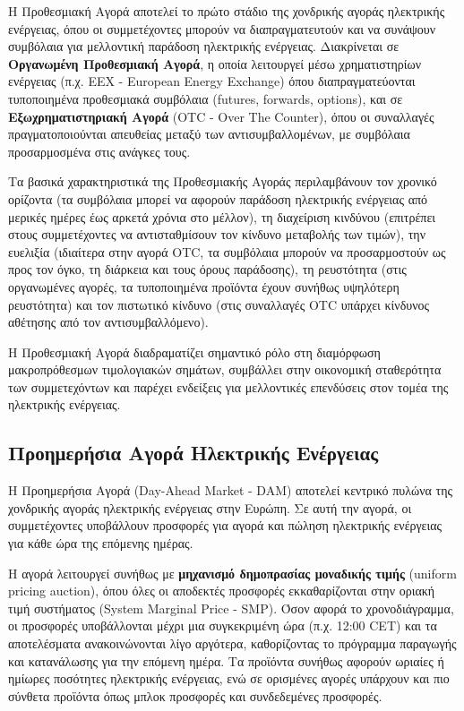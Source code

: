 Η Προθεσμιακή Αγορά αποτελεί το πρώτο στάδιο της χονδρικής αγοράς ηλεκτρικής ενέργειας, όπου οι συμμετέχοντες μπορούν να διαπραγματευτούν και να συνάψουν συμβόλαια για μελλοντική παράδοση ηλεκτρικής ενέργειας. Διακρίνεται σε \textbf{Οργανωμένη Προθεσμιακή Αγορά}, η οποία λειτουργεί μέσω χρηματιστηρίων ενέργειας (π.χ. EEX - European Energy Exchange) όπου διαπραγματεύονται τυποποιημένα προθεσμιακά συμβόλαια (futures, forwards, options), και σε \textbf{Εξωχρηματιστηριακή Αγορά} (OTC - Over The Counter), όπου οι συναλλαγές πραγματοποιούνται απευθείας μεταξύ των αντισυμβαλλομένων, με συμβόλαια προσαρμοσμένα στις ανάγκες τους.

Τα βασικά χαρακτηριστικά της Προθεσμιακής Αγοράς περιλαμβάνουν τον χρονικό ορίζοντα (τα συμβόλαια μπορεί να αφορούν παράδοση ηλεκτρικής ενέργειας από μερικές ημέρες έως αρκετά χρόνια στο μέλλον), τη διαχείριση κινδύνου (επιτρέπει στους συμμετέχοντες να αντισταθμίσουν τον κίνδυνο μεταβολής των τιμών), την ευελιξία (ιδιαίτερα στην αγορά OTC, τα συμβόλαια μπορούν να προσαρμοστούν ως προς τον όγκο, τη διάρκεια και τους όρους παράδοσης), τη ρευστότητα (στις οργανωμένες αγορές, τα τυποποιημένα προϊόντα έχουν συνήθως υψηλότερη ρευστότητα) και τον πιστωτικό κίνδυνο (στις συναλλαγές OTC υπάρχει κίνδυνος αθέτησης από τον αντισυμβαλλόμενο).

Η Προθεσμιακή Αγορά διαδραματίζει σημαντικό ρόλο στη διαμόρφωση μακροπρόθεσμων τιμολογιακών σημάτων, συμβάλλει στην οικονομική σταθερότητα των συμμετεχόντων και παρέχει ενδείξεις για μελλοντικές επενδύσεις στον τομέα της ηλεκτρικής ενέργειας.

\subsection{Προημερήσια Αγορά Ηλεκτρικής Ενέργειας}
\label{subsec:day-ahead-market}

Η Προημερήσια Αγορά (Day-Ahead Market - DAM) αποτελεί κεντρικό πυλώνα της χονδρικής αγοράς ηλεκτρικής ενέργειας στην Ευρώπη. Σε αυτή την αγορά, οι συμμετέχοντες υποβάλλουν προσφορές για αγορά και πώληση ηλεκτρικής ενέργειας για κάθε ώρα της επόμενης ημέρας.

Η αγορά λειτουργεί συνήθως με \textbf{μηχανισμό δημοπρασίας μοναδικής τιμής} (uniform pricing auction), όπου όλες οι αποδεκτές προσφορές εκκαθαρίζονται στην οριακή τιμή συστήματος (System Marginal Price - SMP). Όσον αφορά το χρονοδιάγραμμα, οι προσφορές υποβάλλονται μέχρι μια συγκεκριμένη ώρα (π.χ. 12:00 CET) και τα αποτελέσματα ανακοινώνονται λίγο αργότερα, καθορίζοντας το πρόγραμμα παραγωγής και κατανάλωσης για την επόμενη ημέρα. Τα προϊόντα συνήθως αφορούν ωριαίες ή ημίωρες ποσότητες ηλεκτρικής ενέργειας, ενώ σε ορισμένες αγορές υπάρχουν και πιο σύνθετα προϊόντα όπως μπλοκ προσφορές και συνδεδεμένες προσφορές.


